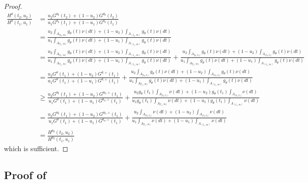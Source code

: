 \documentclass{article}
\begin{document}
\begin{appendix}
\begin{proof}
    \begin{align*}
        \frac{H^{\theta}(t_2, u_2)}{H^{\theta}(t_1, u_1)} &= \frac{u_2G^{\theta_0}(t_2)  + (1-u_2) G^{\theta_0}(t_2)}{u_1 G^{\theta_0}(t_1)  + (1-u_1) G^{\theta_0}(t_1)}\\
        &= \frac{u_2  \int_{A_{[t_2, \infty)}}g_{\theta}(t) \nu(dt)  + (1-u_2) \int_{A_{(t_2, \infty)}} g_{\theta}(t) \nu(dt)}{u_1 \int_{A_{[t_1, \infty)}} g_{\theta}(t) \nu(dt)  + (1-u_1) \int_{A_{(t_1, \infty)}} g_{\theta}(t) \nu(dt)}\\
        &= \frac{u_2  \int_{A_{[t_1, \infty)}}g_{\theta}(t) \nu(dt)  + (1-u_2) \int_{A_{(t_1, \infty)}} g_{\theta}(t) \nu(dt)}{u_1 \int_{A_{[t_1, \infty)}} g_{\theta}(t) \nu(dt)  + (1-u_1) \int_{A_{(t_1, \infty)}} g_{\theta}(t) \nu(dt)} + \frac{u_2  \int_{A_{[t_2, t_1)}}g_{\theta}(t) \nu(dt)  + (1-u_2) \int_{A_{(t_2, t_1]}} g_{\theta}(t) \nu(dt)}{u_1 \int_{A_{[t_1, \infty)}} g_{\theta}(t) \nu(dt)  + (1-u_1) \int_{A_{(t_1, \infty)}} g_{\theta}(t) \nu(dt)}\\
        &= \frac{u_2G^{\theta}(t_1)  + (1-u_2) G^{\theta, +}(t_1)}{u_1 G^{\theta}(t_1)  + (1-u_1) G^{\theta, +}(t_1)} + \frac{u_2  \int_{A_{[t_2, t_1)}}g_{\theta}(t) \nu(dt)  + (1-u_2) \int_{A_{(t_2, t_1]}} g_{\theta}(t) \nu(dt)}{u_1 \int_{A_{[t_1, \infty)}} g_{\theta}(t) \nu(dt)  + (1-u_1) \int_{A_{(t_1, \infty)}} g_{\theta}(t) \nu(dt)}\\
        &\geq \frac{u_2G^{\theta_0}(t_1)  + (1-u_2) G^{\theta_0, +}(t_1)}{u_1 G^{\theta}(t_1)  + (1-u_1) G^{\theta_0, +}(t_1)} + \frac{u_2 g_{\theta}(t_1) \int_{A_{[t_2, t_1)}} \nu(dt)  + (1-u_2) g_{\theta}(t_1)  \int_{A_{(t_2, t_1]}}  \nu(dt)}{u_1 g_{\theta}(t_1) \int_{A_{[t_1, \infty)}}  \nu(dt)  + (1-u_1) g_{\theta}(t_1) \int_{A_{(t_1, \infty)}} \nu(dt)}\\
        &= \frac{u_2G^{\theta_0}(t_1)  + (1-u_2) G^{\theta_0, +}(t_1)}{u_1 G^{\theta}(t_1)  + (1-u_1) G^{\theta_0, +}(t_1)} + \frac{u_2 \int_{A_{[t_2, t_1)}} \nu(dt)  + (1-u_2)   \int_{A_{(t_2, t_1]}}  \nu(dt)}{u_1  \int_{A_{[t_1, \infty)}}  \nu(dt)  + (1-u_1) \int_{A_{(t_1, \infty)}} \nu(dt)}\\
        &= \frac{H^{\theta_0}(t_2, u_2)}{H^{\theta_0}(t_1, u_1)}
    \end{align*}
    which is sufficient. 

\end{proof}
\fi 

\subsection{Proof of }


\end{appendix}
\end{document}
